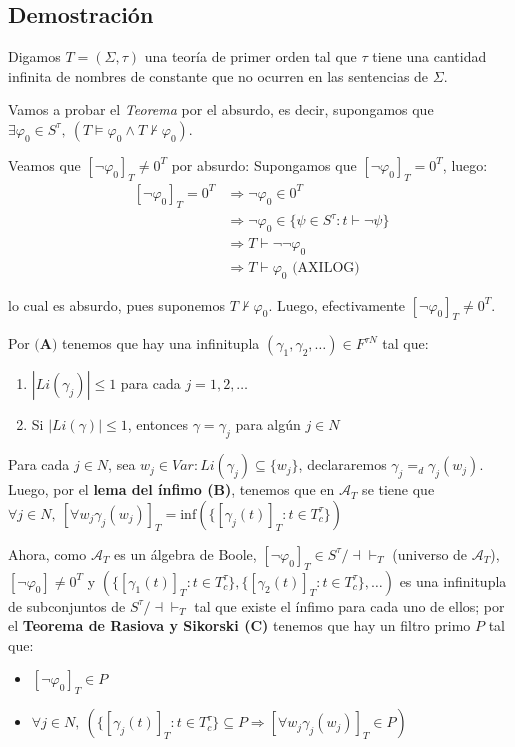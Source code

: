 \documentclass{article}
\begin{document}
\subsection*{Demostración}
Digamos $T=(\Sigma,\tau)$ una teoría de primer orden tal que $\tau$ tiene una cantidad infinita de nombres de constante que no ocurren en las sentencias de $\Sigma$.

Vamos a probar el \textit{Teorema} por el absurdo, es decir, supongamos que $\exists\varphi_0\in S^\tau,\ (T\vDash\varphi_0\land T\nvdash\varphi_0)$.

\vspace{0.3cm}
Veamos que $[\neg\varphi_0]_T\neq 0^T$ por absurdo: Supongamos que $[\neg\varphi_0]_T=0^T$, luego:
\begin{equation*}
  \begin{aligned}
    \ [\neg\varphi_0]_T=0^T & \Rightarrow \neg\varphi_0\in 0^T                              \\
                            & \Rightarrow\neg\varphi_0\in\{\psi\in S^\tau:t\vdash\neg\psi\} \\
                            & \Rightarrow T\vdash\neg\neg\varphi_0                          \\
                            & \Rightarrow T\vdash\varphi_0\text{ (AXILOG)}
  \end{aligned}
\end{equation*}

lo cual es absurdo, pues suponemos $T\nvdash\varphi_0$. Luego, efectivamente $[\neg\varphi_0]_T\neq 0^T$.

\vspace{0.3cm}
Por $\textbf{(A)}$ tenemos que hay una infinitupla $(\gamma_1,\gamma_2,\dots)\in F^{\tau N}$ tal que:
\begin{enumerate}
  \item $|Li(\gamma_j)|\leq 1$ para cada $j=1,2,\dots$
  \item Si $|Li(\gamma)|\leq 1$, entonces $\gamma=\gamma_j$ para algún $j\in N$
\end{enumerate}

Para cada $j\in N$, sea $w_j\in Var:Li(\gamma_j)\subseteq\{w_j\}$, declararemos $\gamma_j=_d\gamma_j(w_j)$. Luego, por el \textbf{lema del ínfimo (B)}, tenemos que en $\mathcal{A}_T$ se tiene que $\forall j\in N,\ [\forall w_j\gamma_j(w_j)]_T=\text{inf}(\{[\gamma_j(t)]_T:t\in T^\tau_c\})$

Ahora, como $\mathcal{A}_T$ es un álgebra de Boole, $[\neg\varphi_0]_T\in S^\tau/\dashv\vdash_T$ (universo de $\mathcal{A}_T$), $[\neg\varphi_0]\neq 0^T$ y $(\{[\gamma_1(t)]_T:t\in T^\tau_c\},\{[\gamma_2(t)]_T:t\in T^\tau_c\},\dots)$ es una infinitupla de subconjuntos de $S^\tau/\dashv\vdash_T$ tal que existe el ínfimo para cada uno de ellos; por el \textbf{Teorema de Rasiova y Sikorski (C)} tenemos que hay un filtro primo $P$ tal que:
\begin{itemize}
  \item $[\neg\varphi_0]_T\in P$
  \item $\forall j\in N,\ (\{[\gamma_j(t)]_T:t\in T^\tau_c\}\subseteq P\Rightarrow [\forall w_j\gamma_j(w_j)]_T\in P)$
\end{itemize}
\end{document}
